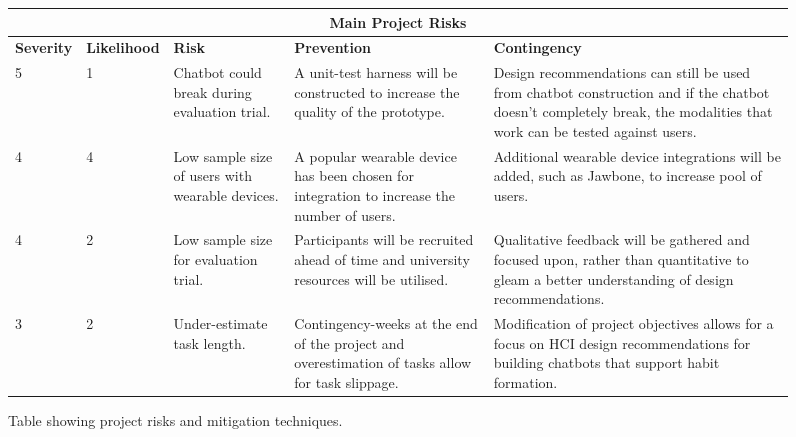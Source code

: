 \renewcommand{\arraystretch}{1.5} %

\begin{figure}[ht]
\begin{center}
\begin{tabular}{ |p{1.35cm}|p{1.8cm}|p{2.3cm}|p{3.7cm}|p{5.1cm}| }
  \hline \multicolumn{5}{|c|}{Main Project Risks} \\ \hline %
  \textbf{\small{Severity}} & \textbf{\small{Likelihood}} & \textbf{\small{Risk}} & \textbf{\small{Prevention}} & \textbf{\small{Contingency}} \\ \hline %
  5 & 1 & Chatbot could break during evaluation trial. & A unit-test harness will be constructed to increase the quality of the prototype. & Design recommendations can still be used from chatbot construction and if the chatbot doesn't completely break, the modalities that work can be tested against users. \\ \hline
  4 & 4 & Low sample size of users with wearable devices. & A popular wearable device has been chosen for integration to increase the number of users. & Additional wearable device integrations will be added, such as Jawbone, to increase pool of users. \\ \hline
  4 & 2 & Low sample size for evaluation trial. & Participants will be recruited ahead of time and university resources will be utilised. & Qualitative feedback will be gathered and focused upon, rather than quantitative to gleam a better understanding of design recommendations.\\ \hline
  3 & 2 & Under-estimate task length. & Contingency-weeks at the end of the project and overestimation of tasks allow for task slippage. & Modification of project objectives allows for a focus on HCI design recommendations for building chatbots that support habit formation. \\ \hline
\end{tabular}
\end{center}
\caption{Table showing project risks and mitigation techniques.}
\end{figure}
